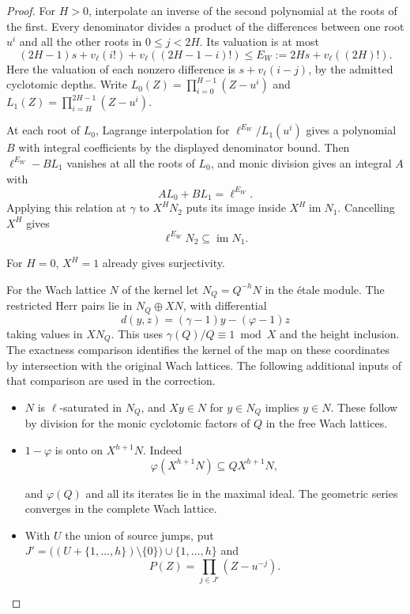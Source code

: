 \begin{proof}
For \(H>0\), interpolate an inverse of the second
polynomial at the roots of the first.
Every denominator divides a product of the
differences between one root \(u^i\) and all the
other roots in \(0\le j<2H\).
Its valuation is at most
\[
 (2H-1)s+v_\ell(i!)+v_\ell((2H-1-i)!)\le
                 E_W:=2Hs+v_\ell((2H)!).
\]
Here the valuation of each nonzero difference is
\(s+v_\ell(i-j)\), by the admitted cyclotomic depths.
Write \(L_0(Z)=\prod_{i=0}^{H-1}(Z-u^i)\) and
\(L_1(Z)=\prod_{i=H}^{2H-1}(Z-u^i)\).

At each root of \(L_0\), Lagrange interpolation for
\(\ell^{E_W}/L_1(u^i)\) gives a polynomial \(B\) with
integral coefficients by the displayed denominator bound.
Then \(\ell^{E_W}-BL_1\) vanishes at all the roots of
\(L_0\), and monic division gives an integral \(A\) with
\[
    A L_0+B L_1=\ell^{E_W}.
\]
Applying this relation at \(\gamma\) to \(X^H N_2\) puts its
image inside \(X^H\operatorname{im}N_1\). Cancelling \(X^H\)
gives
\[
 \ell^{E_W}N_2\subseteq\operatorname{im}N_1.
\]

For \(H=0\), \(X^H=1\) already gives surjectivity.
\label{cor:full-cyclotomic-lifting-2}


For the Wach lattice \(N\) of the kernel let
\(N_Q=Q^{-h}N\) in the étale module.
The restricted Herr pairs lie in \(N_Q\oplus XN\),
with differential
\[
 d(y,z)=(\gamma-1)y-(\varphi-1)z
\]
taking values in \(XN_Q\). This uses
\(\gamma(Q)/Q\equiv1\bmod X\) and the height
inclusion. The exactness comparison identifies
the kernel of the map on these coordinates by
intersection with the original Wach lattices.
The following additional inputs of that comparison
are used in the correction.

\begin{itemize}
\item \(N\) is \(\ell\)-saturated in \(N_Q\), and
  \(Xy\in N\) for \(y\in N_Q\) implies \(y\in N\).
  These follow by division for the monic cyclotomic
  factors of \(Q\) in the free Wach lattices.
\item \(1-\varphi\) is onto on \(X^{h+1}N\).
  Indeed
\[
 \varphi(X^{h+1}N)\subseteq QX^{h+1}N,
\]

  and \(\varphi(Q)\) and all its iterates lie in
  the maximal ideal. The geometric series converges
  in the complete Wach lattice.
\item With \(U\) the union of source jumps, put
  \(J'=\bigl((U+\{1,\ldots,h\})\setminus\{0\}\bigr)
  \cup\{1,\ldots,h\}\) and
\[
 P(Z)=\prod_{j\in J'}(Z-u^{-j}).
\]


\end{itemize}
\end{proof}
